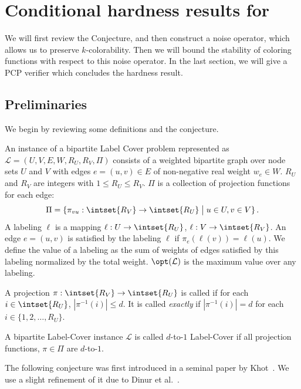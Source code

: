 \section{Conditional hardness results for }
%
We will first review the  Conjecture, and then construct a
noise operator, which allows us to preserve $k$-colorability. Then we
will bound the stability of coloring functions with respect to this
noise operator. In the last section, we will give a PCP verifier which
concludes the hardness result.
%
\vspace{-1ex}
\subsection{Preliminaries}
\label{sec:condhardness}
%
We begin by reviewing some definitions
%
and the  conjecture.
%
\begin{definition}
  An instance of a bipartite Label Cover problem represented as
  $\mathcal{L} = (U, V, E, W, R_U, R_V, \Pi)$ consists of a weighted
  bipartite graph over node sets $U$ and $V$ with edges $e=(u,v) \in
  E$ of non-negative real weight $w_e \in W$. $R_U$ and $R_V$ are
  integers with $1\le R_U\le R_V$. $\Pi$ is a collection of projection
  functions for each edge:
  \[
  \Pi=\{\pi_{vu}:\intset{R_V}\rightarrow\intset{R_U}\;\big|\;u\in U, v\in
  V\}\,.
  \]
  A labeling $\ell$ is a mapping $\ell:U\rightarrow
  \intset{R_U}$, $\ell:V\rightarrow \intset{R_V}$. An edge $e=(u,v)$
  is satisfied by the labeling $\ell$ if $\pi_e(\ell(v))=\ell(u)$. We
  define the value of a labeling as the sum of weights of edges
  satisfied by this labeling normalized by the total
  weight. $\opt(\mathcal{L})$ is the maximum value over any labeling.
\end{definition}
%
%
\begin{definition}
  A projection $\pi:\intset{R_V}\rightarrow \intset{R_U}$ is called
   if for each $i \in \intset{R_U}$, $|\pi^{-1}(i)|\le
  d$. It is called \emph{exactly}  if $|\pi^{-1}(i)|= d$ for
  each $i \in \{1,2,\dots,R_U\}$.
\end{definition}
%
%
\begin{definition}
  A bipartite Label-Cover instance $\mathcal{L}$ is called $d$-to-$1$
  Label-Cover if all projection functions, $\pi \in \Pi$ are
  $d$-to-$1$.
\end{definition}
%
The following conjecture was first introduced in a seminal paper by
Khot~\cite{Khot02}. We use a slight refinement of it due to
Dinur et al.~\cite{DMR}.
